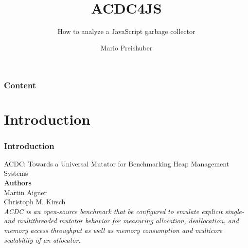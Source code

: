 \documentclass[xcolor=x11names,compress]{beamer}
\title{ACDC4JS}
\subtitle{How to analyze a JavaScript garbage collector}
\author{Mario Preishuber}
\institute[2013]{University of Salzburg}
\begin{document}
	
	\begin{frame}
		\titlepage
	\end{frame}

	\begin{frame}
		\frametitle{Content}
		\setcounter{tocdepth}{1}
		\tableofcontents
	\end{frame}
	
	
	\section{Introduction}	
	\begin{frame}
		\frametitle{Introduction}
		ACDC: Towards a Universal Mutator for
		Benchmarking Heap Management Systems \\
		\bigskip
		\textbf{Authors} \\
		Martin Aigner \\ 
		Christoph M. Kirsch \\
		\bigskip
		\textit{ACDC is an open-source benchmark that be configured to emulate explicit single- and multithreaded mutator behavior 
		for measuring allocation, deallocation, and memory access throughput as well as memory consumption and multicore 
		scalability of an allocator.}
		
	\end{frame}
	
\end{document}
